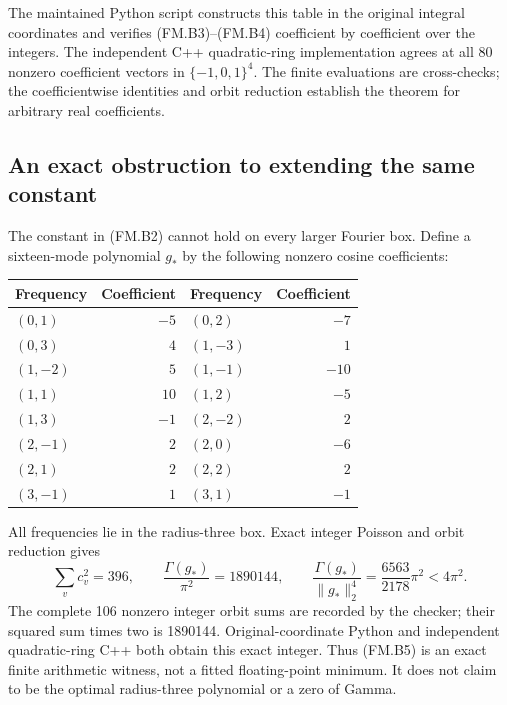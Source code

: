 The maintained Python script constructs this table in the original integral coordinates and verifies (FM.B3)--(FM.B4) coefficient by coefficient over the integers. The independent C++ quadratic-ring implementation agrees at all 80 nonzero coefficient vectors in \(\{-1,0,1\}^4\). The finite evaluations are cross-checks; the coefficientwise identities and orbit reduction establish the theorem for arbitrary real coefficients.

\subsection{An exact obstruction to extending the same constant}\label{four_mode:an-exact-obstruction-to-extending-the-same-constant}

The constant in (FM.B2) cannot hold on every larger Fourier box. Define a sixteen-mode polynomial \(g_*\) by the following nonzero cosine coefficients:

\begin{longtable}[]{@{}lrlr@{}}
\toprule\noalign{}
Frequency & Coefficient & Frequency & Coefficient \\
\midrule\noalign{}
\endhead
\bottomrule\noalign{}
\endlastfoot
\((0,1)\) & \(-5\) & \((0,2)\) & \(-7\) \\
\((0,3)\) & \(4\) & \((1,-3)\) & \(1\) \\
\((1,-2)\) & \(5\) & \((1,-1)\) & \(-10\) \\
\((1,1)\) & \(10\) & \((1,2)\) & \(-5\) \\
\((1,3)\) & \(-1\) & \((2,-2)\) & \(2\) \\
\((2,-1)\) & \(2\) & \((2,0)\) & \(-6\) \\
\((2,1)\) & \(2\) & \((2,2)\) & \(2\) \\
\((3,-1)\) & \(1\) & \((3,1)\) & \(-1\) \\
\end{longtable}

All frequencies lie in the radius-three box. Exact integer Poisson and orbit reduction gives \[
 \sum_v c_v^2=396,\qquad
 \frac{\Gamma(g_*)}{\pi^2}=1890144,\qquad
 \boxed{\frac{\Gamma(g_*)}{\|g_*\|_2^4}
                  =\frac{6563}{2178}\pi^2<4\pi^2.}         \tag{FM.B5}
\] The complete 106 nonzero integer orbit sums are recorded by the checker; their squared sum times two is 1890144. Original-coordinate Python and independent quadratic-ring C++ both obtain this exact integer. Thus (FM.B5) is an exact finite arithmetic witness, not a fitted floating-point minimum. It does not claim to be the optimal radius-three polynomial or a zero of Gamma.

